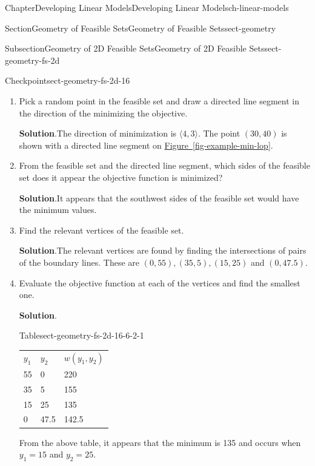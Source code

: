 \documentclass[oneside,10pt,]{book}
\newcommand{\blocktitlefont}{\relax}
\newcommand{\tabularfont}{\relax}
\newcommand{\xreffont}{\relax}
\numberwithin{equation}{section}
\newcommand{\hrulethin}  {\noalign{\hrule height 0.04em}}
\begin{document}
\begin{chapterptx}{Chapter}{Developing Linear Models}{}{Developing Linear Models}{}{}{ch-linear-models}
\begin{sectionptx}{Section}{Geometry of Feasible Sets}{}{Geometry of Feasible Sets}{}{}{sect-geometry}
\begin{subsectionptx}{Subsection}{Geometry of 2D Feasible Sets}{}{Geometry of 2D Feasible Sets}{}{}{sect-geometry-fs-2d}
\begin{inlineexercise}{Checkpoint}{}{sect-geometry-fs-2d-16}
\begin{enumerate}[font=\bfseries,label=(\alph*),ref=\alph*]
\begin{figureptx}{Figure}{}{fig-example-min-lop}{}
\begin{image}{0.15}{0.7}{0.15}{}
{%
}%
\end{image}%
\tcblower
\end{figureptx}%
\item{}Pick a random point in the feasible set and draw a directed line segment in the direction of the minimizing the objective.%
\par\smallskip%
\noindent\textbf{\blocktitlefont Solution}.\hypertarget{sect-geometry-fs-2d-16-3-2}{}\quad{}The direction of minimization is \(\langle 4, 3 \rangle \).  The point \((30,40)\) is shown with a directed line segment on \hyperref[fig-example-min-lop]{Figure~{\xreffont\ref{fig-example-min-lop}}}.%
\item{}From the feasible set and the directed line segment, which sides of the feasible set does it appear the objective function is minimized?%
\par\smallskip%
\noindent\textbf{\blocktitlefont Solution}.\hypertarget{sect-geometry-fs-2d-16-4-2}{}\quad{}It appears that the southwest sides of the feasible set would have the minimum values.%
\item{}Find the relevant vertices of the feasible set.%
\par\smallskip%
\noindent\textbf{\blocktitlefont Solution}.\hypertarget{sect-geometry-fs-2d-16-5-2}{}\quad{}The relevant vertices are found by finding the intersections of pairs of the boundary lines.  These are \((0,55), (35,5), (15,25)\) and \((0, 47.5)\).%
\item{}Evaluate the objective function at each of the vertices and find the smallest one.%
\par\smallskip%
\noindent\textbf{\blocktitlefont Solution}.\hypertarget{sect-geometry-fs-2d-16-6-2}{}\quad{}\begin{tableptx}{Table}{\textbf{}}{sect-geometry-fs-2d-16-6-2-1}{}%
\centering%
{\tabularfont%
\begin{tabular}{lll}
\(y_1\)&\(y_2\)&\(w(y_1, y_2)\)\tabularnewline\hrulethin
55&0&220\tabularnewline[0pt]
35&5&155\tabularnewline[0pt]
15&25&135\tabularnewline[0pt]
0&47.5&142.5
\end{tabular}
}%
\end{tableptx}%
From the above table, it appears that the minimum is 135 and occurs when \(y_1=15\) and \(y_2=25\).%
\end{enumerate}%
\end{inlineexercise}%
\end{subsectionptx}

\end{sectionptx}
\end{chapterptx}
\end{document}
